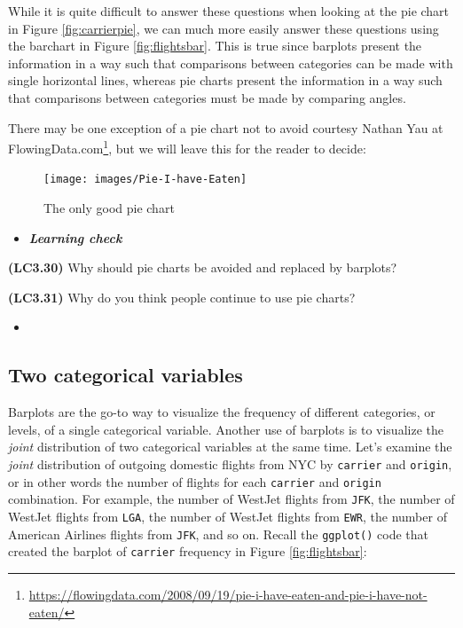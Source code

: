 \documentclass[12pt, krantz2,]{krantz}
\renewcommand{\href}[2]{#2\footnote{\url{#1}}}
\newenvironment{rmdblock}[1]
  {\begin{shaded*}
  \begin{itemize}
  \renewcommand{\labelitemi}{
    \raisebox{-.7\height}[0pt][0pt]{
    }
  }
  \item
  }
  {
  \end{itemize}
  \end{shaded*}
  }
\newenvironment{learncheck}
  {\begin{rmdblock}{warning}}
  {\end{rmdblock}}
\begin{document}
While it is quite difficult to answer these questions when looking at the pie chart in Figure \ref{fig:carrierpie}, we can much more easily answer these questions using the barchart in Figure \ref{fig:flightsbar}. This is true since barplots present the information in a way such that comparisons between categories can be made with single horizontal lines, whereas pie charts present the information in a way such that comparisons between categories must be made by comparing angles.

There may be one exception of a pie chart not to avoid courtesy Nathan Yau at \href{https://flowingdata.com/2008/09/19/pie-i-have-eaten-and-pie-i-have-not-eaten/}{FlowingData.com}, but we will leave this for the reader to decide:

\begin{figure}

{\centering \texttt{[image: images/Pie-I-have-Eaten]} 

}

\caption{The only good pie chart}\label{fig:unnamed-chunk-36}
\end{figure}

\begin{learncheck}
\textbf{\emph{Learning check}}
\end{learncheck}

\textbf{(LC3.30)} Why should pie charts be avoided and replaced by barplots?

\textbf{(LC3.31)} Why do you think people continue to use pie charts?

\begin{learncheck}

\end{learncheck}

\hypertarget{two-categ-barplot}{%
\subsection{Two categorical variables}\label{two-categ-barplot}}

Barplots are the go-to way to visualize the frequency of different categories, or levels, of a single categorical variable. Another use of barplots is to visualize the \emph{joint} distribution of two categorical variables at the same time. Let's examine the \emph{joint} distribution of outgoing domestic flights from NYC by \texttt{carrier} and \texttt{origin}, or in other words the number of flights for each \texttt{carrier} and \texttt{origin} combination. For example, the number of WestJet flights from \texttt{JFK}, the number of WestJet flights from \texttt{LGA}, the number of WestJet flights from \texttt{EWR}, the number of American Airlines flights from \texttt{JFK}, and so on. Recall the \texttt{ggplot()} code that created the barplot of \texttt{carrier} frequency in Figure \ref{fig:flightsbar}:
\end{document}
